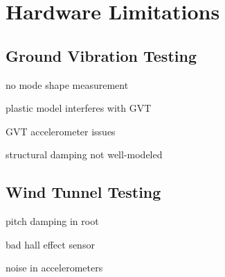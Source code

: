 \section{Hardware Limitations} %
\label{sec:shortcomings}


\subsection{Ground Vibration Testing}
no mode shape measurement

plastic model interferes with GVT

GVT accelerometer issues

structural damping not well-modeled

\subsection{Wind Tunnel Testing}
pitch damping in root

bad hall effect sensor

noise in accelerometers

